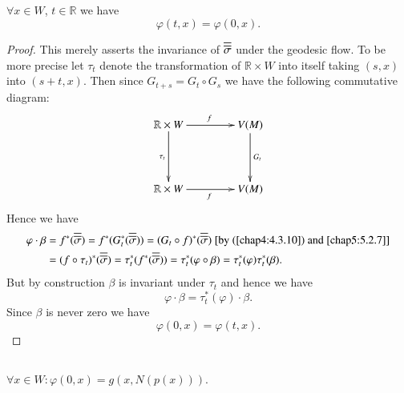 \setcounter{subsection}{6}

\subsection{}\label{chap8:8.8.7}

\begin{lemma*}
$\forall x\in W$, $t\in \mathbb{R}$ we have
$$
\varphi(t,x)=\varphi(0,x).
$$
\end{lemma*}

\begin{proof}
This merely asserts the invariance of $\overline{\overline{\sigma}}$ under the
geodesic flow. To be more precise let $\tau_{t}$ denote the
transformation of $\mathbb{R}\times W$ into itself taking $(s,x)$ into
$(s+t,x)$. Then since $G_{t+s}=G_{t}\circ G_{s}$ we have the following
commutative diagram:
\[
\xymatrix@=1.5cm{
\mathbb{R}\times W\ar[d]_{\tau_{t}}\ar[r]^{f} & V(M)\ar[d]^{G_{t}}\\
\mathbb{R}\times W\ar[r]_{f} & V(M)
}
\]
Hence we have
\begin{align*}
\varphi\cdot \beta &=
f^{\ast}(\overline{\overline{\sigma}})=f^{\ast}(G^{\ast}_{t}(\overline{\overline{\sigma}}))=(G_{t}\circ
f)^{\ast}(\overline{\overline{\sigma}})\text{ [by (\ref{chap4:4.3.10}) and
    \eqref{chap5:5.2.7}]}\\
&= (f\circ
\tau_{t})^{\ast}(\overline{\overline{\sigma}})=\tau^{\ast}_{t}(f^{\ast}(\overline{\overline{\sigma}}))=\tau^{\ast}_{t}(\varphi\circ \beta)=\tau^{\ast}_{t}(\varphi)\tau^{\ast}_{t}(\beta).
\end{align*}
But \pageoriginale by construction $\beta$ is invariant under $\tau_{t}$
and hence we have
$$
\varphi\cdot \beta=\tau^{\ast}_{t}(\varphi)\cdot \beta.
$$
Since $\beta$ is never zero we have
$$
\varphi(0,x)=\varphi(t,x).
$$
\end{proof}

\subsection{}\label{chap8:8.8.8}

\begin{lemma*}
$\forall x\in W:\varphi(0,x)=g(x,N(p(x)))$.
\end{lemma*}

